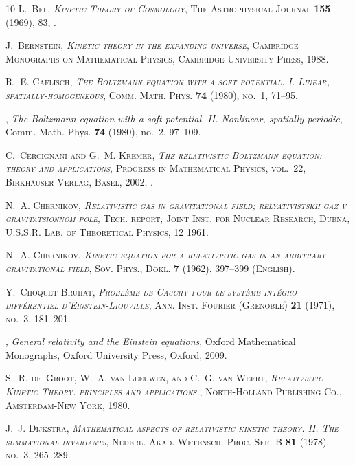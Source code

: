 \documentclass[reqno]{amsart}
\theoremstyle{definition}
\numberwithin{equation}{section}
\numberwithin{theorem}{section}
\begin{document}
\begin{thebibliography}{10}
\bgroup\scshape{}L.~{Bel}\egroup{}, \emph{{Kinetic Theory of Cosmology}}, The Astrophysical Journal \textbf{155} (1969), 83, .

\bgroup\scshape{}J.~Bernstein\egroup{}, \emph{Kinetic theory in the expanding universe}, Cambridge Monographs on Mathematical Physics, Cambridge University Press, 1988.

\bgroup\scshape{}R.~E. Caflisch\egroup{}, \emph{The {B}oltzmann equation with a soft potential. {I}. {L}inear, spatially-homogeneous}, Comm. Math. Phys. \textbf{74} (1980), no.~1, 71--95.

\bysame, \emph{The {B}oltzmann equation with a soft potential. {II}. {N}onlinear, spatially-periodic}, Comm. Math. Phys. \textbf{74} (1980), no.~2, 97--109.

\bgroup\scshape{}C.~Cercignani\egroup{} and \bgroup\scshape{}G.~M. Kremer\egroup{}, \emph{The relativistic {B}oltzmann equation: theory and applications}, Progress in Mathematical Physics, vol.~22, Birkh\"auser Verlag, Basel, 2002, .

\bgroup\scshape{}N.~A. Chernikov\egroup{}, \emph{Relativistic gas in gravitational field; relyativistskii gaz v gravitatsionnom pole}, Tech. report, Joint Inst. for Nuclear Research, Dubna, U.S.S.R. Lab. of Theoretical Physics, 12 1961.

\bgroup\scshape{}N.~A. Chernikov\egroup{}, \emph{Kinetic equation for a relativistic gas in an arbitrary gravitational field}, Sov. Phys., Dokl. \textbf{7} (1962), 397--399 (English).

\bgroup\scshape{}Y.~Choquet-Bruhat\egroup{}, \emph{Probl\`eme de {C}auchy pour le syst\`eme int\'{e}gro diff\'{e}rentiel d'{E}instein-{L}iouville}, Ann. Inst. Fourier (Grenoble) \textbf{21} (1971), no.~3, 181--201.

\bysame, \emph{{General relativity and the {E}instein equations}}, Oxford Mathematical Monographs, Oxford University Press, Oxford, 2009.

\bgroup\scshape{}S.~R. de~Groot\egroup{}, \bgroup\scshape{}W.~A. van Leeuwen\egroup{}, and \bgroup\scshape{}C.~G. van Weert\egroup{}, \emph{Relativistic {K}inetic {T}heory. principles and applications.}, North-Holland Publishing Co., Amsterdam-New York, 1980.

\bgroup\scshape{}J.~J. Dijkstra\egroup{}, \emph{Mathematical aspects of relativistic kinetic theory. {II}. {T}he summational invariants}, Nederl. Akad. Wetensch. Proc. Ser. B \textbf{81} (1978), no.~3, 265--289.


\end{thebibliography}
\end{document}
